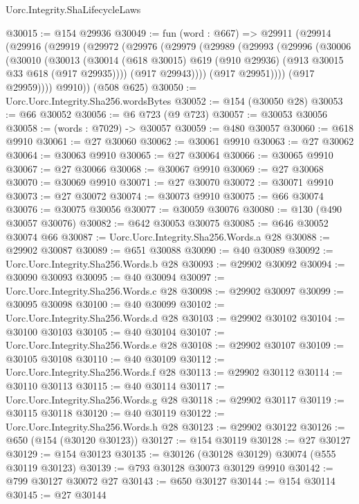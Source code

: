 \begin{lexlean}{Uorc.Integrity.ShaLifecycleLaws}
\begin{coremodule}
@30015 := @154 @29936
@30049 := fun (word : @667) =>
  @29911
    (@29914
      (@29916
        (@29919
          (@29972
            (@29976
              (@29979
                (@29989
                  (@29993
                    (@29996
                      (@30006
                        (@30010
                          (@30013
                            (@30014
                              (@618 @30015)
                              @619
                              (@910 @29936)
                              (@913 @30015 @33 @618 (@917 @29935))))
                          (@917 @29943))))
                    (@917 @29951))))
              (@917 @29959))))
        @9910))
    (@508 @625)
@30050 := Uorc.Uorc.Integrity.Sha256.wordsBytes
@30052 := @154 (@30050 @28)
@30053 := @66 @30052
@30056 := @6 @723 (@9 @723)
@30057 := @30053 @30056
@30058 := (words : @7029) -> @30057
@30059 := @480 @30057
@30060 := @618 @9910
@30061 := @27 @30060
@30062 := @30061 @9910
@30063 := @27 @30062
@30064 := @30063 @9910
@30065 := @27 @30064
@30066 := @30065 @9910
@30067 := @27 @30066
@30068 := @30067 @9910
@30069 := @27 @30068
@30070 := @30069 @9910
@30071 := @27 @30070
@30072 := @30071 @9910
@30073 := @27 @30072
@30074 := @30073 @9910
@30075 := @66 @30074
@30076 := @30075 @30056
@30077 := @30059 @30076
@30080 := @130 (@490 @30057 @30076)
@30082 := @642 @30053 @30075
@30085 := @646 @30052 @30074 @66
@30087 := Uorc.Uorc.Integrity.Sha256.Words.a @28
@30088 := @29902 @30087
@30089 := @651 @30088
@30090 := @40 @30089
@30092 := Uorc.Uorc.Integrity.Sha256.Words.b @28
@30093 := @29902 @30092
@30094 := @30090 @30093
@30095 := @40 @30094
@30097 := Uorc.Uorc.Integrity.Sha256.Words.c @28
@30098 := @29902 @30097
@30099 := @30095 @30098
@30100 := @40 @30099
@30102 := Uorc.Uorc.Integrity.Sha256.Words.d @28
@30103 := @29902 @30102
@30104 := @30100 @30103
@30105 := @40 @30104
@30107 := Uorc.Uorc.Integrity.Sha256.Words.e @28
@30108 := @29902 @30107
@30109 := @30105 @30108
@30110 := @40 @30109
@30112 := Uorc.Uorc.Integrity.Sha256.Words.f @28
@30113 := @29902 @30112
@30114 := @30110 @30113
@30115 := @40 @30114
@30117 := Uorc.Uorc.Integrity.Sha256.Words.g @28
@30118 := @29902 @30117
@30119 := @30115 @30118
@30120 := @40 @30119
@30122 := Uorc.Uorc.Integrity.Sha256.Words.h @28
@30123 := @29902 @30122
@30126 := @650 (@154 (@30120 @30123))
@30127 := @154 @30119
@30128 := @27 @30127
@30129 := @154 @30123
@30135 := @30126 (@30128 @30129) @30074 (@555 @30119 @30123)
@30139 := @793 @30128 @30073 @30129 @9910
@30142 := @799 @30127 @30072 @27
@30143 := @650 @30127
@30144 := @154 @30114
@30145 := @27 @30144

\end{coremodule}
\end{lexlean}
